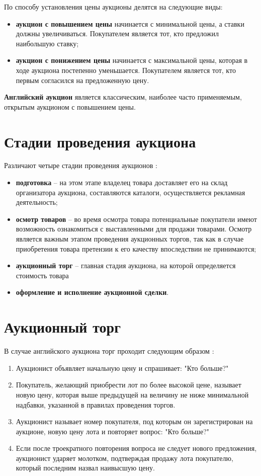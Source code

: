 По способу установления цены аукционы делятся на следующие виды:
\begin{itemize}
    \item \textbf{аукцион с повышением цены} начинается с минимальной цены, а ставки должны увеличиваться. Покупателем является тот, кто предложил наибольшую ставку;
    \item \textbf{аукцион с понижением цены} начинается с максимальной цены, которая в ходе аукциона постепенно уменьшается. Покупателем является тот, кто первым согласился на предложенную цену.
\end{itemize}

\textbf{Английский аукцион} является классическим, наиболее часто применяемым, открытым аукционом с повышением цены.

\section{Стадии проведения аукциона}

Различают четыре стадии проведения аукционов \cite{strovskiy2017ved}:
\begin{itemize}
    \item \textbf{подготовка} -- на этом этапе владелец товара доставляет его на склад организатора аукциона, составляются каталоги, осуществляется рекламная деятельность;
    \item \textbf{осмотр товаров} -- во время осмотра товара потенциальные покупатели имеют возможность ознакомиться с выставленными для продажи товарами. Осмотр является важным этапом проведения аукционных торгов, так как в случае приобретения товара претензии к его качеству впоследствии не принимаются;
    \item \textbf{аукционный торг} -- главная стадия аукциона, на которой определяется стоимость товара
    \item \textbf{оформление и исполнение аукционной сделки}.
\end{itemize}

\section{Аукционный торг}

В случае английского аукциона торг проходит следующим образом \cite{strovskiy2017ved}:
\begin{enumerate}
    \item Аукционист объявляет начальную цену и спрашивает: "Кто больше?"{}
    \item Покупатель, желающий приобрести лот по более высокой цене, называет новую цену, которая выше предыдущей на величину не ниже минимальной надбавки, указанной в правилах проведения торгов.
    \item Аукционист называет номер покупателя, под которым он зарегистрирован на аукционе, новую цену лота и повторяет вопрос: "Кто больше?"{}
    \item Если после троекратного повторения вопроса не следует нового предложения, аукционист ударяет молотком, подтверждая продажу лота покупателю, который последним назвал наивысшую цену.
\end{enumerate}

